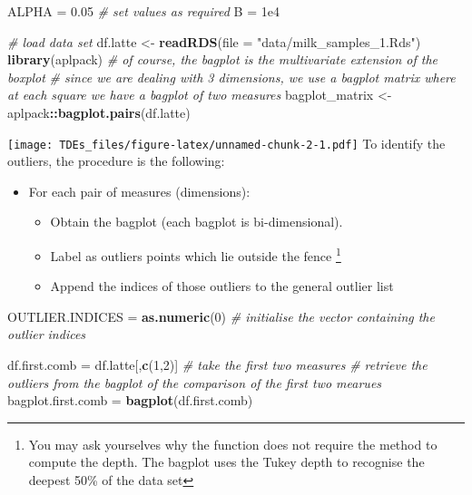 \documentclass[
]{article}
\newenvironment{Shaded}{\begin{snugshade}}{\end{snugshade}}
\newcommand{\AttributeTok}[1]{\textcolor[rgb]{0.13,0.29,0.53}{#1}}
\newcommand{\CommentTok}[1]{\textcolor[rgb]{0.56,0.35,0.01}{\textit{#1}}}
\newcommand{\DecValTok}[1]{\textcolor[rgb]{0.00,0.00,0.81}{#1}}
\newcommand{\FloatTok}[1]{\textcolor[rgb]{0.00,0.00,0.81}{#1}}
\newcommand{\FunctionTok}[1]{\textcolor[rgb]{0.13,0.29,0.53}{\textbf{#1}}}
\newcommand{\NormalTok}[1]{#1}
\newcommand{\OtherTok}[1]{\textcolor[rgb]{0.56,0.35,0.01}{#1}}
\newcommand{\SpecialCharTok}[1]{\textcolor[rgb]{0.81,0.36,0.00}{\textbf{#1}}}
\newcommand{\StringTok}[1]{\textcolor[rgb]{0.31,0.60,0.02}{#1}}
\providecommand{\tightlist}{%
  \setlength{\itemsep}{0pt}\setlength{\parskip}{0pt}}
\begin{document}
\begin{Shaded}
\begin{Highlighting}[]
\NormalTok{ALPHA }\OtherTok{=} \FloatTok{0.05} \CommentTok{\# set values as required}
\NormalTok{B }\OtherTok{=} \FloatTok{1e4}

\CommentTok{\# load data set}
\NormalTok{df.latte }\OtherTok{\textless{}{-}} \FunctionTok{readRDS}\NormalTok{(}\AttributeTok{file =} \StringTok{"data/milk\_samples\_1.Rds"}\NormalTok{)}
\FunctionTok{library}\NormalTok{(aplpack)}
\CommentTok{\# of course, the bagplot is the multivariate extension of the boxplot}
\CommentTok{\# since we are dealing with 3 dimensions, we use a bagplot matrix where at each square we have a bagplot of two measures}
\NormalTok{bagplot\_matrix }\OtherTok{\textless{}{-}}\NormalTok{ aplpack}\SpecialCharTok{::}\FunctionTok{bagplot.pairs}\NormalTok{(df.latte)}
\end{Highlighting}
\end{Shaded}

\texttt{[image: TDEs\_files/figure-latex/unnamed-chunk-2-1.pdf]} To
identify the outliers, the procedure is the following:

\begin{itemize}
\tightlist
\item
  For each pair of measures (dimensions):

  \begin{itemize}
  \tightlist
  \item
    Obtain the bagplot (each bagplot is bi-dimensional).
  \item
    Label as outliers points which lie outside the fence \footnote{You
      may ask yourselves why the function does not require the method to
      compute the depth. The bagplot uses the Tukey depth to recognise
      the deepest 50\% of the data set}
  \item
    Append the indices of those outliers to the general outlier list
  \end{itemize}
\end{itemize}

\begin{Shaded}
\begin{Highlighting}[]
\NormalTok{OUTLIER.INDICES }\OtherTok{=} \FunctionTok{as.numeric}\NormalTok{(}\DecValTok{0}\NormalTok{)  }\CommentTok{\# initialise the vector containing the outlier indices}

\NormalTok{df.first.comb }\OtherTok{=}\NormalTok{ df.latte[,}\FunctionTok{c}\NormalTok{(}\DecValTok{1}\NormalTok{,}\DecValTok{2}\NormalTok{)]  }\CommentTok{\# take the first two measures}
\CommentTok{\# retrieve the outliers from the bagplot of the comparison of the first two mearues}
\NormalTok{bagplot.first.comb }\OtherTok{=} \FunctionTok{bagplot}\NormalTok{(df.first.comb)}
\end{Highlighting}
\end{Shaded}
\end{document}
